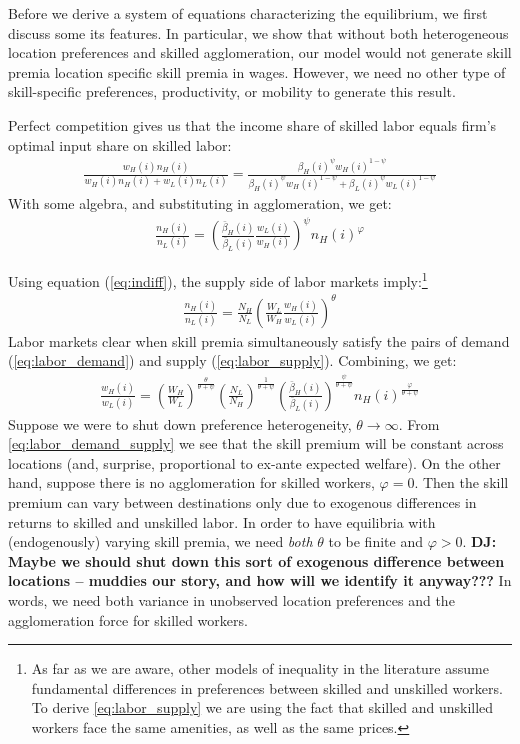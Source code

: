 \documentclass{article}
\begin{document}
Before we derive a system of equations characterizing the equilibrium, we first discuss some its features.  In particular, we show that without both heterogeneous location preferences and skilled agglomeration, our model would not generate skill premia location specific skill premia in wages.  However, we need no other type of skill-specific preferences, productivity, or mobility to generate this result.

Perfect competition gives us that the income share of skilled labor equals firm's optimal input share on skilled labor:
\begin{eqnarray}
\frac{w_H(i) n_H(i)}{w_H(i) n_H(i) + w_L(i) n_L(i)}  = \frac{\beta_H(i)^{\psi} w_H(i)^{1-\psi}}{\beta_H(i)^{\psi} w_H(i)^{1-\psi} + \beta_L(i)^{\psi} w_L(i)^{1-\psi}} \nonumber
\end{eqnarray}
With some algebra, and substituting in agglomeration, we get:
\begin{eqnarray}\label{eq:labor_demand}
    \frac{n_H(i)}{n_L(i)} = \left(\frac{\bar{\beta}_H(i)}{\bar{\beta}_L(i)}\frac{w_L(i)}{w_H(i)}\right)^\psi n_H(i)^{\varphi}
\end{eqnarray}

Using equation (\ref{eq:indiff}), the supply side of labor markets imply:\footnote{As far as we are aware, other models of inequality in the literature assume fundamental differences in preferences between skilled and unskilled workers.  To derive \eqref{eq:labor_supply} we are using the fact that skilled and unskilled workers face the same amenities, as well as the same prices.}
\begin{eqnarray}\label{eq:labor_supply}
    \frac{n_H(i)}{n_L(i)} = \frac{N_H}{N_L} \left(\frac{W_L}{W_H} \frac{w_H(i)}{w_L(i)}\right)^{\theta}
\end{eqnarray}
Labor markets clear when skill premia simultaneously satisfy the pairs of demand (\ref{eq:labor_demand}) and supply (\ref{eq:labor_supply}).  Combining, we get:
\begin{eqnarray}\label{eq:labor_demand_supply}
    \frac{w_H(i)}{w_L(i)} = \left(\frac{W_H}{W_L}\right)^{\frac{\theta}{\theta + \psi}}\left(\frac{N_L}{N_H}\right)^{\frac{1}{\theta + \psi}} \left(\frac{\bar{\beta}_H(i)}{\bar{\beta}_L(i)}\right)^{\frac{\psi}{\theta + \psi}} n_H(i)^{\frac{\varphi}{\theta + \psi}}
\end{eqnarray}
Suppose we were to shut down preference heterogeneity, $\theta \rightarrow \infty$.  From \eqref{eq:labor_demand_supply} we see that the skill premium will be constant across locations (and, surprise, proportional to ex-ante expected welfare).  On the other hand, suppose there is no agglomeration for skilled workers, $\varphi = 0$.  Then the skill premium can vary between destinations only due to exogenous differences in returns to skilled and unskilled labor.  In order to have equilibria with (endogenously) varying skill premia, we need \emph{both} $\theta$ to be finite and $\varphi >0$.  \textbf{DJ: Maybe we should shut down this sort of exogenous difference between locations -- muddies our story, and how will we identify it anyway???}  In words, we need both variance in unobserved location preferences and the agglomeration force for skilled workers.  
\end{document}
